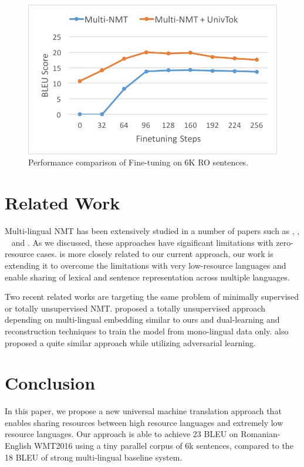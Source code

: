 \begin{figure}
	\centering
	\includegraphics[width=\linewidth]{figs/ulr/finetuning}\vspace{-20pt}
	\caption{\label{fig.finetune}Performance comparison of Fine-tuning on 6K RO sentences.}

\end{figure}



\section{Related Work} 
Multi-lingual NMT has been extensively studied in a number of papers such as  , , ~ and . As we discussed, these approaches have significant limitations with zero-resource cases.  is more closely related to our current approach, our work is extending  it  to overcome the  limitations with very low-resource languages and enable sharing of  lexical and sentence representation across multiple languages. 

Two recent related works are targeting the same problem of  minimally supervised  or totally unsupervised NMT.  proposed a totally unsupervised approach depending on multi-lingual embedding similar to ours and dual-learning and reconstruction techniques to train the model from mono-lingual data only.  also proposed a quite similar approach while utilizing adversarial learning.   

\section{Conclusion}
 In this paper, we propose a new  universal machine translation approach that enables sharing resources between high resource languages and extremely low resource languages. 
  Our approach is able to achieve 23 BLEU on Romanian-English WMT2016 using a tiny parallel corpus of 6k sentences, compared to the 18 BLEU of strong multi-lingual baseline system. 